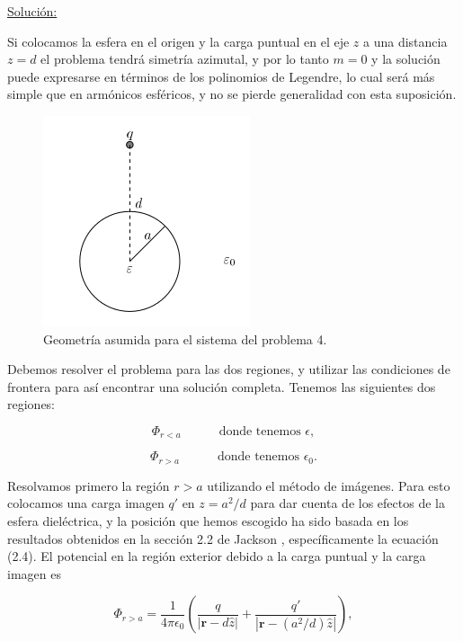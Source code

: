 \documentclass[a4paper,11pt]{article}
\numberwithin{equation}{section}
\begin{document}
\vspace{.3cm}

\underline{Solución:} \vspace{.3cm}

Si colocamos la esfera en el origen y la carga puntual en el eje $z$ a una distancia 
$z = d$ el problema tendrá simetría azimutal, y por lo tanto $m = 0$ y la solución 
puede expresarse en términos de los polinomios de Legendre, lo cual será más simple 
que en armónicos esféricos, y no se pierde generalidad con esta suposición. 

\begin{figure}[H]
 \center 
 \includegraphics[scale=0.8]{problema4fig1}
 \caption{Geometría asumida para el sistema del problema 4.}
\end{figure}


Debemos resolver el problema para las dos regiones, y utilizar las condiciones 
de frontera para así encontrar una solución completa. Tenemos las siguientes dos 
regiones:

\begin{equation}
 \Phi_{r < a} \quad \qquad \text{donde tenemos } \epsilon,
\end{equation}

\begin{equation}
  \Phi_{r > a} \quad \qquad \text{donde tenemos } \epsilon_0.
\end{equation}

Resolvamos primero la región $r > a$ utilizando el método de imágenes. Para esto 
colocamos una carga imagen $q'$ en $z = a^2/d$ para dar cuenta de los efectos 
de la esfera dieléctrica, y la posición que hemos escogido ha sido basada en 
los resultados obtenidos en la sección 2.2 de Jackson \cite{jackson}, específicamente 
la ecuación (2.4). El potencial en la región exterior debido a la carga puntual 
y la carga imagen es 

\begin{equation}
 \Phi_{r > a} = \frac{1}{4\pi\epsilon_0}\left(\frac{q}{|\mathbf{r}-d\hat{z}|} 
 + \frac{q'}{|\mathbf{r} - (a^2/d)\hat{z}|}\right),
\end{equation}
\end{document}
